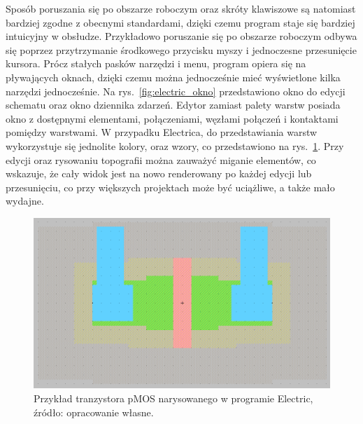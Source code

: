 Sposób poruszania się po obszarze roboczym oraz skróty klawiszowe są natomiast bardziej zgodne z obecnymi standardami,
dzięki czemu program staje się bardziej intuicyjny w obsłudze.
Przykładowo poruszanie się po obszarze roboczym odbywa się poprzez przytrzymanie środkowego przycisku myszy
i jednoczesne przesunięcie kursora.
Prócz stałych pasków narzędzi i menu, program opiera się na pływających oknach,
dzięki czemu można jednocześnie mieć wyświetlone kilka narzędzi jednocześnie.
Na rys.~\ref{fig:electric_okno} przedstawiono okno do edycji schematu oraz okno dziennika zdarzeń.
Edytor zamiast palety warstw posiada okno z dostępnymi elementami, połączeniami, węzłami połączeń
i kontaktami pomiędzy warstwami.
W przypadku Electrica, do przedstawiania warstw wykorzystuje się jednolite kolory, oraz wzory,
co przedstawiono na rys.~\ref{fig:electric_tran}.
Przy edycji oraz rysowaniu topografii można zauważyć miganie elementów,
co wskazuje, że cały widok jest na nowo renderowany po każdej edycji lub przesunięciu,
co przy większych projektach może być uciążliwe, a także mało wydajne.

\begin{figure}[h]
    \centering
    \includegraphics[width=.9\textwidth]{chapters/chapter2/img/electric_tran}
    \caption[Przykład tranzystora pMOS narysowanego w programie Electric]
    {
        Przykład tranzystora pMOS narysowanego w programie Electric,
        źródło: opracowanie własne.
    }
    \label{fig:electric_tran}
\end{figure}
